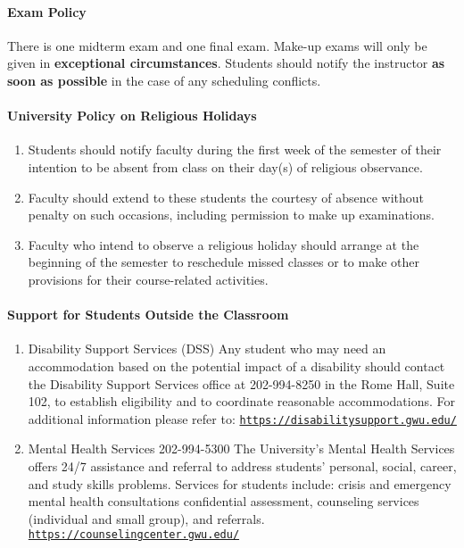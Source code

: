 \documentclass[11pt, reqno]{article}   	%
\begin{document}
\paragraph{Exam Policy}
There is one midterm exam and one final exam. 
Make-up exams will only be given in \textbf{exceptional circumstances}.
Students should notify the instructor \textbf{as soon as possible} in the case of any scheduling conflicts.

\paragraph{University Policy on Religious Holidays}
\begin{enumerate}
    \item Students should notify faculty during the first week of the semester of their intention to be absent from class on their day(s) of religious observance.
    \item Faculty should extend to these students the courtesy of absence without penalty on such occasions, including permission to make up examinations.
    \item Faculty who intend to observe a religious holiday should arrange at the beginning of the semester to reschedule missed classes or to make other provisions for their course-related activities.
\end{enumerate}

\paragraph{Support for Students Outside the Classroom}
\begin{enumerate}
    \item Disability Support Services (DSS)
    Any student who may need an accommodation based on the potential impact of a disability should contact the Disability Support Services office at 202-994-8250 in the Rome Hall, Suite 102, to establish eligibility and to coordinate reasonable accommodations. 
    For additional information please refer to: \href{https://disabilitysupport.gwu.edu/}{\texttt{https://disabilitysupport.gwu.edu/}}
    \item Mental Health Services 202-994-5300
    The University's Mental Health Services offers 24/7 assistance and referral to address students' personal, social, career, and study skills problems. 
    Services for students include: crisis and emergency mental health consultations confidential assessment, counseling services (individual and small group), and referrals.
    \href{https://counselingcenter.gwu.edu/}{\texttt{https://counselingcenter.gwu.edu/}}
\end{enumerate}
\end{document}
